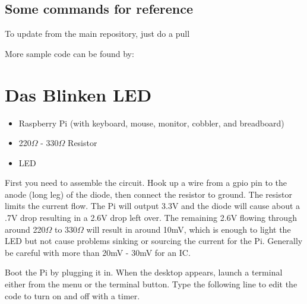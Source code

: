 



\subsection{Some commands for reference}
To update from the main repository, just do a pull


More sample code can be found by:





\section{Das Blinken LED}

\begin{itemize}
  \item Raspberry Pi (with keyboard, mouse, monitor, cobbler, and breadboard)
  \item 220$\Omega$ - 330$\Omega$ Resistor
  \item LED
\end{itemize}

First you need to assemble the circuit.  Hook up a wire from a gpio pin to the anode (long leg) of the diode, then connect the resistor to ground.  The resistor limits the current flow.  The Pi will output 3.3V and the diode will cause about a .7V drop resulting in a 2.6V drop left over.  The remaining 2.6V flowing through around 220$\Omega$ to 330$\Omega$ will result in around 10mV, which is enough to light the LED but not cause problems sinking or sourcing the current for the Pi.  Generally be careful with more than 20mV - 30mV for an IC.

Boot the Pi by plugging it in.  When the desktop appears, launch a terminal either from the menu or the terminal button.  Type the following line to edit the code to turn on and off with a timer.


